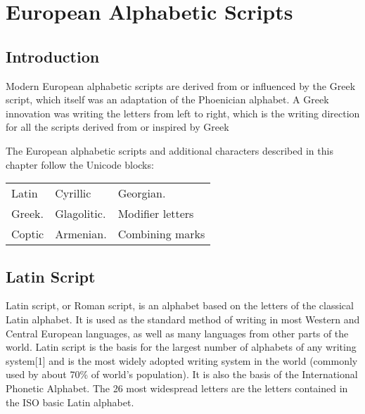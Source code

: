 
\chapter{European Alphabetic Scripts}

\section{Introduction}

Modern European alphabetic scripts are derived from or influenced by the Greek script,
which itself was an adaptation of the Phoenician alphabet. A Greek innovation was writing
the letters from left to right, which is the writing direction for all the scripts derived from or
inspired by Greek

The European alphabetic scripts and additional characters described in this chapter follow the Unicode blocks:
\medskip


\begin{center}
\begin{tabular}{lll}
Latin &Cyrillic &Georgian.\\
Greek. &Glagolitic. &Modifier letters\\
Coptic &Armenian. &Combining marks\\
\end{tabular}
\end{center}

\section{Latin Script}

Latin script, or Roman script, is an alphabet based on the letters of the classical Latin alphabet. It is used as the standard method of writing in most Western and Central European languages, as well as many languages from other parts of the world. Latin script is the basis for the largest number of alphabets of any writing system[1] and is the most widely adopted writing system in the world (commonly used by about 70\% of world's population). It is also the basis of the International Phonetic Alphabet. The 26 most widespread letters are the letters contained in the ISO basic Latin alphabet.

